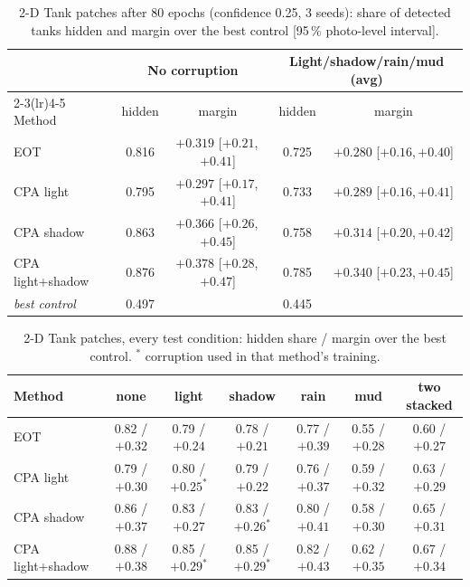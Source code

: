 \documentclass[11pt,a4paper]{article}
\newcommand{\ci}[2]{{\footnotesize[#1,\,#2]}}
\begin{document}
\begin{table}[htbp]
\centering\small
\caption{2-D Tank patches after 80 epochs (confidence 0.25, 3 seeds): share of detected tanks hidden and margin over the best control [95\,\% photo-level interval].}
\label{tab:2d}
\setlength{\tabcolsep}{4pt}
\begin{tabular}{@{}lcccc@{}}
\toprule
 & \multicolumn{2}{c}{No corruption} & \multicolumn{2}{c}{Light/shadow/rain/mud (avg)} \\
\cmidrule(lr){2-3}\cmidrule(lr){4-5}
Method & hidden & margin & hidden & margin \\
\midrule
EOT & 0.816 & $+0.319$ \ci{$+0.21$}{$+0.41$} & 0.725 & $+0.280$ \ci{$+0.16$}{$+0.40$} \\
CPA light & 0.795 & $+0.297$ \ci{$+0.17$}{$+0.41$} & 0.733 & $+0.289$ \ci{$+0.16$}{$+0.41$} \\
CPA shadow & 0.863 & $+0.366$ \ci{$+0.26$}{$+0.45$} & 0.758 & $+0.314$ \ci{$+0.20$}{$+0.42$} \\
CPA light+shadow & 0.876 & $+0.378$ \ci{$+0.28$}{$+0.47$} & 0.785 & $+0.340$ \ci{$+0.23$}{$+0.45$} \\
\midrule
\textit{best control} & 0.497 & & 0.445 & \\
\bottomrule
\end{tabular}
\end{table}

\begin{table}[htbp]
\centering\small
\caption{2-D Tank patches, every test condition: hidden share / margin over the best control. $^\ast$ corruption used in that method's training.}
\label{tab:2dcond}
\setlength{\tabcolsep}{4pt}
\begin{tabular}{@{}lcccccc@{}}
\toprule
Method & none & light & shadow & rain & mud & two stacked \\
\midrule
EOT & 0.82 / $+0.32$ & 0.79 / $+0.24$ & 0.78 / $+0.21$ & 0.77 / $+0.39$ & 0.55 / $+0.28$ & 0.60 / $+0.27$ \\
CPA light & 0.79 / $+0.30$ & 0.80 / $+0.25^\ast$ & 0.79 / $+0.22$ & 0.76 / $+0.37$ & 0.59 / $+0.32$ & 0.63 / $+0.29$ \\
CPA shadow & 0.86 / $+0.37$ & 0.83 / $+0.27$ & 0.83 / $+0.26^\ast$ & 0.80 / $+0.41$ & 0.58 / $+0.30$ & 0.65 / $+0.31$ \\
CPA light+shadow & 0.88 / $+0.38$ & 0.85 / $+0.29^\ast$ & 0.85 / $+0.29^\ast$ & 0.82 / $+0.43$ & 0.62 / $+0.35$ & 0.67 / $+0.34$ \\
\bottomrule
\end{tabular}
\end{table}
\end{document}
